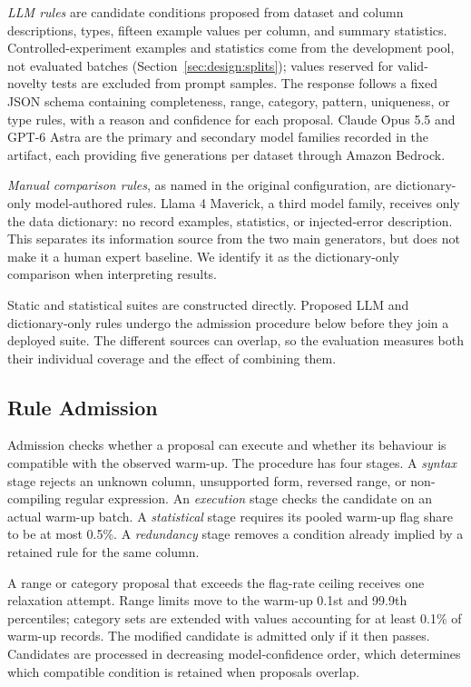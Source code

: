 \emph{LLM rules} are candidate conditions proposed from dataset and column descriptions, types, fifteen example values per column, and summary statistics. Controlled-experiment examples and statistics come from the development pool, not evaluated batches (Section~\ref{sec:design:splits}); values reserved for valid-novelty tests are excluded from prompt samples. The response follows a fixed JSON schema containing completeness, range, category, pattern, uniqueness, or type rules, with a reason and confidence for each proposal. Claude Opus 5.5 and GPT-6 Astra are the primary and secondary model families recorded in the artifact, each providing five generations per dataset through Amazon Bedrock.

\emph{Manual comparison rules}, as named in the original configuration, are dictionary-only model-authored rules. Llama 4 Maverick, a third model family, receives only the data dictionary: no record examples, statistics, or injected-error description. This separates its information source from the two main generators, but does not make it a human expert baseline. We identify it as the dictionary-only comparison when interpreting results.

Static and statistical suites are constructed directly. Proposed LLM and dictionary-only rules undergo the admission procedure below before they join a deployed suite. The different sources can overlap, so the evaluation measures both their individual coverage and the effect of combining them.

\subsection{Rule Admission}
\label{sec:method:admission}

Admission checks whether a proposal can execute and whether its behaviour is compatible with the observed warm-up. The procedure has four stages. A \emph{syntax} stage rejects an unknown column, unsupported form, reversed range, or non-compiling regular expression. An \emph{execution} stage checks the candidate on an actual warm-up batch. A \emph{statistical} stage requires its pooled warm-up flag share to be at most 0.5\%. A \emph{redundancy} stage removes a condition already implied by a retained rule for the same column.

A range or category proposal that exceeds the flag-rate ceiling receives one relaxation attempt. Range limits move to the warm-up 0.1st and 99.9th percentiles; category sets are extended with values accounting for at least 0.1\% of warm-up records. The modified candidate is admitted only if it then passes. Candidates are processed in decreasing model-confidence order, which determines which compatible condition is retained when proposals overlap.

